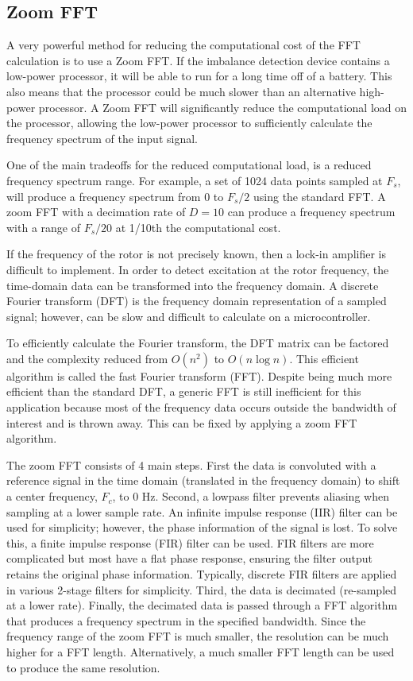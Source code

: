 \subsection{Zoom FFT}
A very powerful method for reducing the computational cost of the FFT calculation is to use a Zoom FFT.  If the imbalance detection device contains a low-power processor, it will be able to run for a long time off of a battery.  This also means that the processor could be much slower than an alternative high-power processor.  A Zoom FFT will significantly reduce the computational load on the processor, allowing the low-power processor to sufficiently calculate the frequency spectrum of the input signal.

One of the main tradeoffs for the reduced computational load, is a reduced frequency spectrum range.  For example, a set of 1024 data points sampled at $F_s$, will produce a frequency spectrum from $0$ to $F_s/2$ using the standard FFT.  A zoom FFT with a decimation rate of $D=10$ can produce a frequency spectrum with a range of $F_s/20$ at 1/10th the computational cost.

If the frequency of the rotor is not precisely known, then a lock-in amplifier is difficult to implement.  In order to detect excitation at the rotor frequency, the time-domain data can be transformed into the frequency domain.  A discrete Fourier transform (DFT) is the frequency domain representation of a sampled signal; however, can be slow and difficult to calculate on a microcontroller.

To efficiently calculate the Fourier transform, the DFT matrix can be factored and the complexity reduced from $O(n^2)$ to $O(n \log{n})$.  This efficient algorithm is called the fast Fourier transform (FFT).  Despite being much more efficient than the standard DFT, a generic FFT is still inefficient for this application because most of the frequency data occurs outside the bandwidth of interest and is thrown away.  This can be fixed by applying a zoom FFT algorithm.

The zoom FFT consists of 4 main steps.  First the data is convoluted with a reference signal in the time domain (translated in the frequency domain) to shift a center frequency, $F_c$, to 0 Hz.  Second, a lowpass filter prevents aliasing when sampling at a lower sample rate.  An infinite impulse response (IIR) filter can be used for simplicity; however, the phase information of the signal is lost.  To solve this, a finite impulse response (FIR) filter can be used.  FIR filters are more complicated but most have a flat phase response, ensuring the filter output retains the original phase information.  Typically, discrete FIR filters are applied in various 2-stage filters for simplicity.  Third, the data is decimated (re-sampled at a lower rate). Finally, the decimated data is passed through a FFT algorithm that produces a frequency spectrum in the specified bandwidth.  Since the frequency range of the zoom FFT is much smaller, the resolution can be much higher for a FFT length.  Alternatively, a much smaller FFT length can be used to produce the same resolution.

